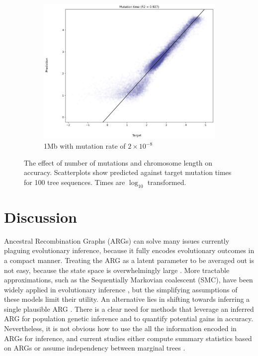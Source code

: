 \begin{figure}[htp]
\begin{subfigure}[b]{.51\linewidth}
\end{subfigure}
\hfill
\begin{subfigure}[b]{.51\linewidth}
\includegraphics[width=\linewidth]{tsnn_figs/tsnn_ntrain_900_clen_1mb_mut-rate_2e-8_ssize_100_scatter_val_redone.jpg}
\caption{1Mb with mutation rate of $2\times10^{-8}$}\label{fig:1mb_8}
\end{subfigure}
\caption[The effect of number of mutations and chromosome length on accuracy]{
The effect of number of mutations and chromosome length on accuracy.
Scatterplots show predicted against target mutation times for 100 tree sequences.
Times are $\log_{10}$ transformed.
}
\label{fig:tsnn_vs_gnn}
\end{figure}


\section{Discussion}

Ancestral Recombination Graphs (ARGs) can solve many issues currently plaguing evolutionary inference, 
because it fully encodes evolutionary outcomes in a compact manner.
Treating the ARG as a latent parameter to be averaged out is not easy, because the state space is overwhelmingly large \citep{griffiths_ancestral_1996,nielsen_estimation_2000}.
More tractable approximations, such as the Sequentially Markovian coalescent (SMC), have been widely applied in evolutionary inference \citep{mcvean_approximating_2005, schraiber_methods_2015}, 
but the simplifying assumptions of these models limit their utility.
An alternative lies in shifting towards inferring a single plausible ARG \citep{kelleher_inferring_2019, speidel_method_2019, wong_general_2023}.
There is a clear need for methods that leverage an inferred ARG for population genetic inference
and to quantify potential gains in accuracy.
Nevertheless, it is not obvious how to use the all the information encoded in ARGs for inference,
and current studies either compute summary statistics based on ARGs or assume independency between marginal trees \citep{fan_likelihood-based_2023, hejase_deep-learning_2022}.


